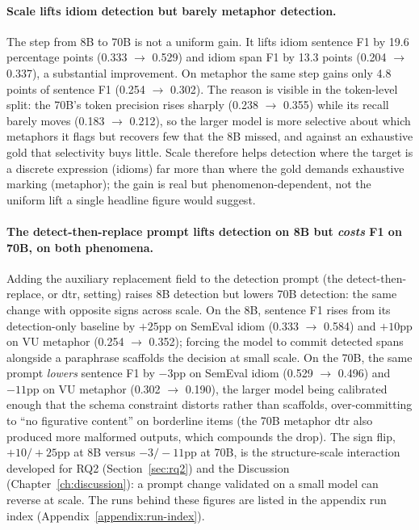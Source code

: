 \paragraph{Scale lifts idiom detection but barely metaphor detection.} The step from 8B to 70B is not a uniform gain. It lifts idiom sentence F1 by 19.6 percentage points (0.333 $\to$ 0.529) and idiom span F1 by 13.3 points (0.204 $\to$ 0.337), a substantial improvement. On metaphor the same step gains only 4.8 points of sentence F1 (0.254 $\to$ 0.302). The reason is visible in the token-level split: the 70B's token precision rises sharply (0.238 $\to$ 0.355) while its recall barely moves (0.183 $\to$ 0.212), so the larger model is more selective about which metaphors it flags but recovers few that the 8B missed, and against an exhaustive gold that selectivity buys little. Scale therefore helps detection where the target is a discrete expression (idioms) far more than where the gold demands exhaustive marking (metaphor); the gain is real but phenomenon-dependent, not the uniform lift a single headline figure would suggest.

\paragraph{The detect-then-replace prompt lifts detection on 8B but \textit{costs} F1 on 70B, on both phenomena.} Adding the auxiliary replacement field to the detection prompt (the detect-then-replace, or dtr, setting) raises 8B detection but lowers 70B detection: the same change with opposite signs across scale. On the 8B, sentence F1 rises from its detection-only baseline by $+25$pp on SemEval idiom (0.333 $\to$ 0.584) and $+10$pp on VU metaphor (0.254 $\to$ 0.352); forcing the model to commit detected spans alongside a paraphrase scaffolds the decision at small scale. On the 70B, the same prompt \textit{lowers} sentence F1 by $-3$pp on SemEval idiom (0.529 $\to$ 0.496) and $-11$pp on VU metaphor (0.302 $\to$ 0.190), the larger model being calibrated enough that the schema constraint distorts rather than scaffolds, over-committing to ``no figurative content'' on borderline items (the 70B metaphor dtr also produced more malformed outputs, which compounds the drop). The sign flip, $+10/+25$pp at 8B versus $-3/-11$pp at 70B, is the structure-scale interaction developed for RQ2 (Section~\ref{sec:rq2}) and the Discussion (Chapter~\ref{ch:discussion}): a prompt change validated on a small model can reverse at scale. The runs behind these figures are listed in the appendix run index (Appendix~\ref{appendix:run-index}).

